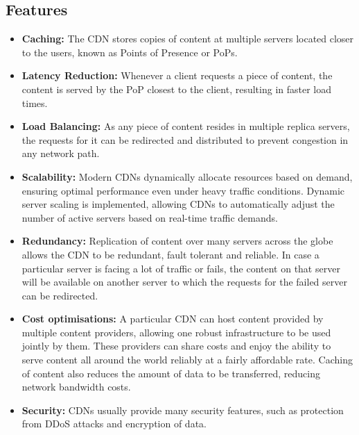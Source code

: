 \documentclass[12pt]{article}
\begin{document}
\subsection{Features}
\begin{itemize}
    \item \textbf{Caching:} The CDN stores copies of content at multiple servers located closer to the
    users, known as Points of Presence or PoPs.
    \item \textbf{Latency Reduction:} Whenever a client requests a piece of content, the content is
    served by the PoP closest to the client, resulting in faster load times.
    \item \textbf{Load Balancing:} As any piece of content resides in multiple replica servers, the
    requests for it can be redirected and distributed to prevent congestion in any network
    path.
    \item \textbf{Scalability:} Modern CDNs dynamically allocate resources based on demand, ensuring
    optimal performance even under heavy traffic conditions. Dynamic server scaling is
    implemented, allowing CDNs to automatically adjust the number of active servers based
    on real-time traffic demands.
    \item \textbf{Redundancy:} Replication of content over many servers across the globe allows the
    CDN to be redundant, fault tolerant and reliable. In case a particular server is facing a
    lot of traffic or fails, the content on that server will be available on another server to
    which the requests for the failed server can be redirected.
    \item \textbf{Cost optimisations:} A particular CDN can host content provided by multiple content
    providers, allowing one robust infrastructure to be used jointly by them. These providers
    can share costs and enjoy the ability to serve content all around the world reliably at a
    fairly affordable rate. Caching of content also reduces the amount of data to be
    transferred, reducing network bandwidth costs.
    \item \textbf{Security:} CDNs usually provide many security features, such as protection from DDoS
    attacks and encryption of data.
\end{itemize}
\end{document}
